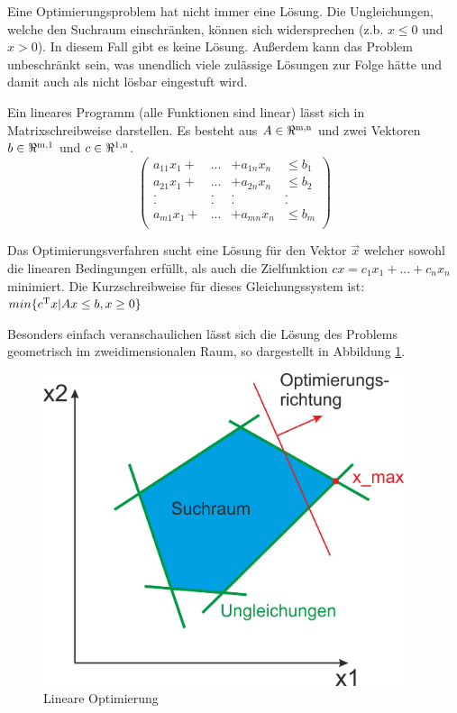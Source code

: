 \documentclass{like}
\begin{document}
Eine Optimierungsproblem hat nicht immer eine Lösung. Die Ungleichungen, welche den Suchraum einschränken, können sich widersprechen (z.b. $x \leq 0 $ und $x > 0$). In diesem Fall gibt es keine Lösung. Außerdem kann das Problem unbeschränkt sein, was unendlich viele zulässige Lösungen zur Folge hätte und damit auch als nicht lösbar eingestuft wird. 

Ein lineares Programm (alle Funktionen sind linear) lässt sich in Matrixschreibweise darstellen. Es besteht aus $A \in \Re \textsuperscript{m,n}$ und zwei Vektoren $b \in \Re \textsuperscript{m,1}$ und $c \in \Re \textsuperscript{1,n}$. \\

\[ \left( \begin{array}{cccc}
a_{11} x_1 + & ... & + a_{1n} x_n & \leq b_1 \\   	
a_{21} x_1 + & ... & + a_{2n} x_n & \leq b_2 \\ 
. & . & . & . \\
. & . & . & . \\
a_{m1} x_1 + & ... & + a_{mn} x_n & \leq b_m \\
\end{array} \right)\] 

Das Optimierungsverfahren sucht eine Lösung für den Vektor \(\vec{x}\) welcher sowohl die linearen Bedingungen erfüllt, als auch die Zielfunktion 
$cx=c_1 x_1 + ... + c_n x_n$ minimiert.
Die Kurzschreibweise für dieses Gleichungssystem ist: \\
$min \{ c\textsuperscript{T}x | Ax \leq b, x \geq 0 \}$

Besonders einfach veranschaulichen lässt sich die Lösung des Problems geometrisch im zweidimensionalen Raum, so dargestellt in Abbildung \ref*{fig:linOpt}.

\begin{figure}[ht!]
	\centering
	\includegraphics[width=300pt]{Abbildungen/linearOpt.png}
	\caption{Lineare Optimierung}
	\label{fig:linOpt}
\end{figure}
\end{document}
